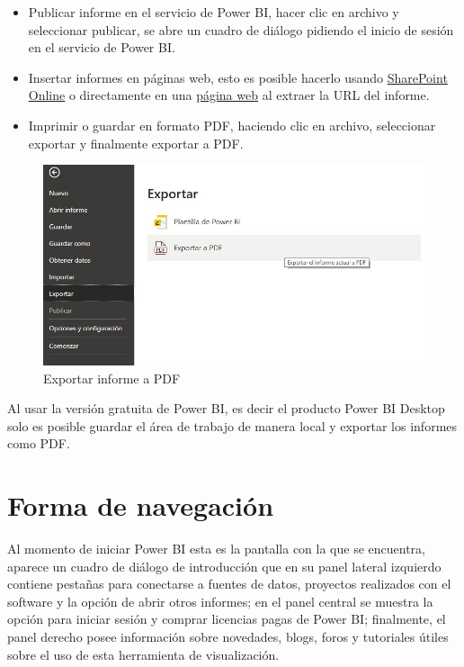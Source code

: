 \documentclass[
]{book}
\begin{document}
\begin{itemize}
\item
  Publicar informe en el servicio de Power BI, hacer clic en archivo y seleccionar publicar, se abre un cuadro de diálogo pidiendo el inicio de sesión en el servicio de Power BI.
\item
  Insertar informes en páginas web, esto es posible hacerlo usando \href{https://docs.microsoft.com/es-es/power-bi/collaborate-share/service-embed-report-spo}{SharePoint Online} o directamente en una \href{https://docs.microsoft.com/es-es/power-bi/collaborate-share/service-embed-secure}{página web} al extraer la URL del informe.
\item
  Imprimir o guardar en formato PDF, haciendo clic en archivo, seleccionar exportar y finalmente exportar a PDF.
\end{itemize}

\begin{figure}

{\centering \includegraphics[width=0.6\linewidth]{Imágenes/powerbi3} 

}

\caption{Exportar informe a PDF}\label{fig:exportarinforme-fig}
\end{figure}

Al usar la versión gratuita de Power BI, es decir el producto Power BI Desktop solo es posible guardar el área de trabajo de manera local y exportar los informes como PDF.

\hypertarget{formadenavegacionpower}{%
\section{Forma de navegación}\label{formadenavegacionpower}}

Al momento de iniciar Power BI esta es la pantalla con la que se encuentra, aparece un cuadro de diálogo de introducción que en su panel lateral izquierdo contiene pestañas para conectarse a fuentes de datos, proyectos realizados con el software y la opción de abrir otros informes; en el panel central se muestra la opción para iniciar sesión y comprar licencias pagas de Power BI; finalmente, el panel derecho posee información sobre novedades, blogs, foros y tutoriales útiles sobre el uso de esta herramienta de visualización.
\end{document}
